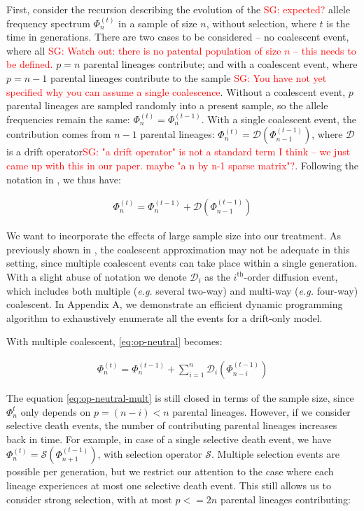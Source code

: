 \documentclass[review]{elsarticle}
\newcommand{\sgcomment}[1]{\textcolor{red}{SG: #1}}
\begin{document}
First, consider the recursion describing the evolution of the \sgcomment{expected?} allele frequency spectrum
$\Phi_{n}^{(t)}$ in a sample of size $n$, without selection, where $t$ is the time in generations. There are two cases to be considered --
no coalescent event, where all \sgcomment{Watch out: there is no patental population of size $n$ -- this needs to be defined.} $p=n$ parental lineages contribute; and with a coalescent event,
where $p=n-1$ parental lineages contribute to the sample \sgcomment{You have not yet specified why you can assume a single coalescence}. Without a coalescent event, $p$ parental
lineages are sampled randomly into a present sample, so the allele frequencies remain the same:
$\Phi_{n}^{(t)}=\Phi_{n}^{(t-1)}$. With a single coalescent event, the contribution comes from $n-1$
parental lineages: $\Phi_{n}^{(t)}=\mathcal{D}(\Phi_{n-1}^{(t-1)})$, where $\mathcal{D}$ is a drift
operator\sgcomment{"a drift operator" is not a standard term I think -- we just came up with this in our paper. maybe "a n by n-1 sparse matrix"?}. Following the notation in \cite{JouganousEtAl2017}, we thus have:

\begin{align}
  \label{eq:op-neutral}
  \Phi_{n}^{(t)}=\Phi_{n}^{(t-1)}+\mathcal{D}(\Phi_{n-1}^{(t-1)})
\end{align}

We want to incorporate the effects of large sample size into our treatment. As previously shown in
\cite{BhaskarEtAl2014,NelsonEtAl2019}, the coalescent approximation may not be adequate in this
setting, since multiple coalescent events can take place within a single generation. With a slight
abuse of notation we denote $\mathcal{D}_i$ as the $i^{\text{th}}$-order diffusion event, which includes both
multiple (\textit{e.g.} several two-way) and multi-way (\textit{e.g.} four-way) coalescent. In
Appendix A, we demonstrate an efficient dynamic programming algorithm to exhaustively enumerate all
the events for a drift-only model.

With multiple coalescent, \eqref{eq:op-neutral} becomes:

\begin{align}
  \label{eq:op-neutral-mult}
  \Phi_{n}^{(t)}=\Phi_{n}^{(t-1)}+\sum_{i=1}^{n}\mathcal{D}_i(\Phi_{n-i}^{(t-1)})
\end{align}

The equation \eqref{eq:op-neutral-mult} is still closed in terms of the sample size, since
$\Phi_{n}^{t}$ only depends on $p=(n-i)<n$ parental lineages. However, if we consider
selective death events, the number of contributing parental lineages increases back in time. For
example, in case of a single selective death event, we have
$\Phi_{n}^{(t)}=\mathcal{S}(\Phi_{n+1}^{(t-1)})$, with selection operator $\mathcal{S}$. Multiple
selection events are possible per generation, but we restrict our attention to the case where each
lineage experiences at most one selective death event. This still allows us to consider strong
selection, with at most $p<=2n$ parental lineages contributing:
\end{document}
